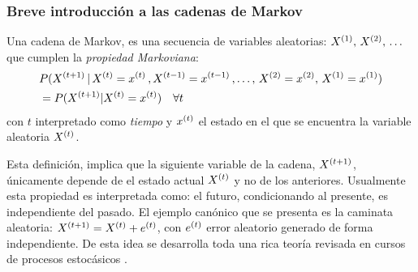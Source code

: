 \documentclass[../Main/Main.tex]{subfiles}
\begin{document}
\subsubsection*{Breve introducción a las cadenas de Markov}
\begin{definition}
Una cadena de Markov, es una secuencia de variables aleatorias: $X^{(1)},\,X^{(2)},\,\ldots$ que cumplen la \textit{propiedad Markoviana}:
\begin{align*}
&P(X^{(t+1)}\,|\,X^{(t)} = x^{(t)}\, ,X^{(t-1)} = x^{(t-1)}\,,\ldots,\,X^{(2)} = x^{(2)},\,X^{(1)} = x^{(1)}) \\
&= P(X^{(t+1)}|X^{(t)} = x^{(t)}) \quad\forall t
\end{align*}
con $t$ interpretado como \textit{tiempo} y $x^{(t)}$ el estado en el que se encuentra la variable aleatoria $X^{(t)}$.
\end{definition}
Esta definición, implica que la siguiente variable de la cadena, $X^{(t+1)}$, únicamente depende de el estado actual $X^{(t)}$ y no de los anteriores. Usualmente esta propiedad es interpretada como: el futuro, condicionando al presente, es independiente del pasado. El ejemplo canónico que se presenta es la caminata aleatoria: $X^{(t+1)} = X^{(t)} + e^{(t)}$, con $e^{(t)}$ error aleatorio generado de forma independiente. De esta idea se desarrolla toda una rica teoría revisada en cursos de procesos estocásicos \citet{ross2009introduction}. 
\end{document}
